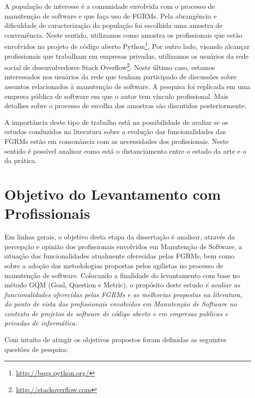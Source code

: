 A população de interesse é a comunidade envolvida com o processo de manutenção
de software e que faça uso de FGRMs. Pela abrangência e dificuldade de
caracterização da população foi escolhida uma amostra de conveniência. Neste
sentido, utilizamos como amostra os profissionais que estão envolvidos no
projeto de código aberto Python\footnote{\url{http://bugs.python.org/}}. Por
outro lado, visando alcançar profissionais que trabalham em empresas privadas,
utilizamos os usuários da rede social de desenvolvedores Stack
Overflow\footnote{\url{http://stackoverflow.com}}. Neste último caso, estamos
interessados nos usuários da rede que tenham participado de discussões sobre
assuntos relacionados à manutenção de software. A pesquisa foi replicada em uma
empresa pública de software em que o autor tem vínculo profissional. Mais
detalhes sobre o processo de escolha das amostras são discutidos
posteriormente.

A importância deste tipo de trabalho está na possibilidade de avaliar se os
estudos conduzidos na literatura sobre a evolução das funcionalidades das FGRMs
estão em consonância com as necessidades dos profissionais. Neste sentido é
possível analisar como está o distanciamento entre o estado da arte e o da
prática.

\section{Objetivo do Levantamento com Profissionais}
\label{sec:objetivo_da_pesquisa_com_profissionais}

Em linhas gerais, o objetivo desta etapa da dissertação é analisar, através da
percepção e opinião dos profissionais envolvidos em Manutenção de Software, a
situação das funcionalidades atualmente oferecidas pelas FGRMs, bem como sobre a
adoção das metodologias propostas pelos agilistas no processo de manutenção de
software. Colocando a finalidade do levantamento com base no método GQM
(Goal, Question e Metric)\cite{gqm}, o propósito deste estudo \textit{é avaliar
    as funcionalidades oferecidas pelas FGRMs e as melhorias propostas na
    literatura, do ponto de vista dos profissionais envolvidos em Manutenção de
    Software no contexto de projetos de software de código aberto e em empresas
    publicas e privadas de informática.}

Com intuito de atingir os objetivos propostos foram definidas as seguintes
questões de pesquisa:

